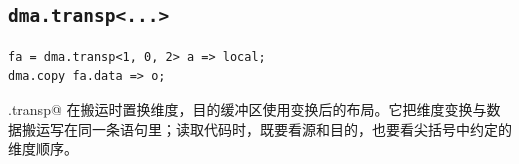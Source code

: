 \subsection*{\texttt{dma.transp\textless{}...\textgreater{}}}

\begin{lstlisting}[language=croqtile,caption={dma.transp\textless{}...\textgreater{}}]
fa = dma.transp<1, 0, 2> a => local;
dma.copy fa.data => o;
\end{lstlisting}

\co@dma.transp@ 在搬运时置换维度，目的缓冲区使用变换后的布局。它把维度变换与数据搬运写在同一条语句里；读取代码时，既要看源和目的，也要看尖括号中约定的维度顺序。
